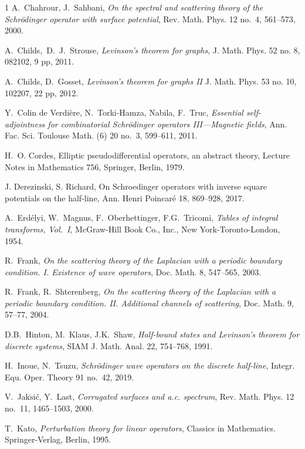 \documentclass[11pt]{article}
\begin{document}
\begin{thebibliography}{1}
A.~Chahrour, J.~Sahbani,
\emph{On the spectral and scattering theory of the Schr\"odinger operator with
surface potential},
Rev. Math. Phys. 12 no.~4, 561--573, 2000.

A.~Childs,~D.~J.~Strouse, 
\emph{Levinson's theorem for graphs},
J. Math. Phys. 52 no. 8, 082102, 9 pp, 2011.

A.~Childs, D.~Gosset, 
\emph{Levinson's theorem for graphs II}
J. Math. Phys. 53 no. 10, 102207, 22 pp, 2012.

Y.~Colin de Verdi\`ere, N.~Torki-Hamza, Nabila, F.~Truc,  
\emph{Essential self-adjointness for combinatorial Schr\"odinger operators III—Magnetic fields},
Ann. Fac. Sci. Toulouse Math. (6) 20 no.~3, 599--611, 2011.

H.~O. Cordes, 
\newblock Elliptic pseudodifferential operators, an abstract theory, 
\newblock Lecture Notes in Mathematics 756, Springer, Berlin, 1979.

J. Derezinski, S. Richard,
\newblock On Schroedinger operators with inverse square potentials on the half-line,
\newblock Ann. Henri Poincar\'e 18, 869--928, 2017.

A.~Erd\'elyi, W.~Magnus, F.~Oberhettinger, F.G.~Tricomi, 
\emph{Tables of integral transforms, Vol.~I},
McGraw-Hill Book Co., Inc., New York-Toronto-London, 1954. 
 
R.~Frank,
\emph{On the scattering theory of the {L}aplacian with a periodic boundary
condition. I. {E}xistence of wave operators},
Doc. Math. 8, 547--565, 2003.

R.~Frank, R.~Shterenberg,
\emph{On the scattering theory of the Laplacian with a periodic boundary
condition. II. Additional channels of scattering},
Doc. Math. 9, 57--77, 2004.

D.B.~Hinton, M.~Klaus, J.K.~Shaw, 
\emph{Half-bound states and Levinson’s theorem for discrete systems}, 
SIAM J. Math. Anal. 22, 754--768, 1991.

H.~Inoue, N.~Tsuzu,
\emph{Schr\"odinger wave operators on the discrete half-line},
Integr. Equ. Oper. Theory 91 no.~42, 2019.

V.~Jak$\check {\mathrm s }$i\' c, Y.~Last,
\emph{Corrugated surfaces and a.c. spectrum},
Rev. Math. Phys. 12 no.~11, 1465--1503, 2000.

T.~Kato,
\emph{Perturbation theory for linear operators},
Classics in Mathematics. Springer-Verlag, Berlin, 1995.


\end{thebibliography}
\end{document}
